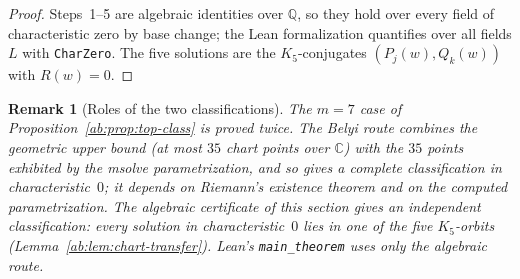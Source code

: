 \documentclass[a4paper,11pt]{article}
\theoremstyle{jsplain}
\theoremstyle{jsdef}
\theoremstyle{jsrem}
\newtheorem{remark}[theorem]{Remark}
\begin{document}
\begin{proof}
Steps~1--5 are algebraic identities over $\mathbb{Q}$, so they hold over every field of characteristic zero by base change; the Lean formalization quantifies over all fields $L$ with \texttt{CharZero}. The five solutions are the $K_5$-conjugates $(P_j(w),Q_k(w))$ with $R(w)=0$.
\end{proof}

\begin{remark}[Roles of the two classifications]
The $m=7$ case of Proposition~\ref{ab:prop:top-class} is proved twice. The Belyi route combines the geometric upper bound (at most $35$ chart points over $\mathbb{C}$) with the $35$ points exhibited by the msolve parametrization, and so gives a complete classification in characteristic~$0$; it depends on Riemann's existence theorem and on the computed parametrization. The algebraic certificate of this section gives an independent classification: every solution in characteristic~$0$ lies in one of the five $K_5$-orbits (Lemma~\ref{ab:lem:chart-transfer}). Lean's \texttt{main\_\allowbreak{}theorem} uses only the algebraic route.
\end{remark}
\end{document}
